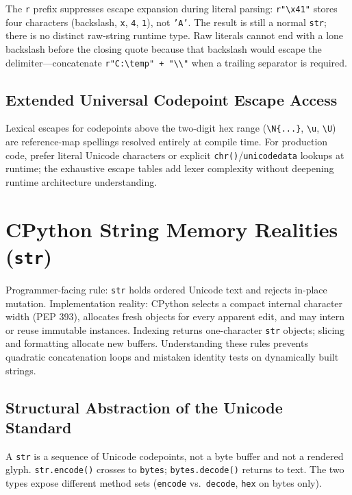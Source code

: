 \documentclass[a4paper,twoside]{report}
\begin{document}
The \texttt{r} prefix suppresses escape expansion during literal parsing: \texttt{r"\textbackslash x41"} stores four characters (backslash, \texttt{x}, \texttt{4}, \texttt{1}), not \texttt{'A'}. The result is still a normal \texttt{str}; there is no distinct raw-string runtime type. Raw literals cannot end with a lone backslash before the closing quote because that backslash would escape the delimiter---concatenate \texttt{r"C:\textbackslash temp" + "\textbackslash\textbackslash"} when a trailing separator is required.


\subsection{Extended Universal Codepoint Escape Access}

Lexical escapes for codepoints above the two-digit hex range (\texttt{\textbackslash N\{...\}}, \texttt{\textbackslash u}, \texttt{\textbackslash U}) are reference-map spellings resolved entirely at compile time. For production code, prefer literal Unicode characters or explicit \texttt{chr()}/\texttt{unicodedata} lookups at runtime; the exhaustive escape tables add lexer complexity without deepening runtime architecture understanding.


\section{CPython String Memory Realities (\texttt{str})}

Programmer-facing rule: \texttt{str} holds ordered Unicode text and rejects in-place mutation. Implementation reality: CPython selects a compact internal character width (PEP 393), allocates fresh objects for every apparent edit, and may intern or reuse immutable instances. Indexing returns one-character \texttt{str} objects; slicing and formatting allocate new buffers. Understanding these rules prevents quadratic concatenation loops and mistaken identity tests on dynamically built strings.


\subsection{Structural Abstraction of the Unicode Standard}

A \texttt{str} is a sequence of Unicode codepoints, not a byte buffer and not a rendered glyph. \texttt{str.encode()} crosses to \texttt{bytes}; \texttt{bytes.decode()} returns to text. The two types expose different method sets (\texttt{encode} vs.\ \texttt{decode}, \texttt{hex} on bytes only).
\end{document}
